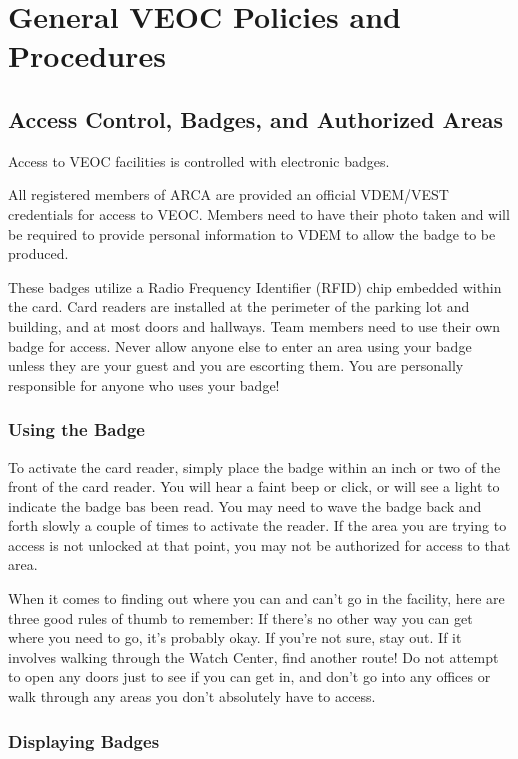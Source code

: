 \documentclass[pdflatex,letterpaper,twoside,12pt]{book}
\begin{document}
\chapter{General VEOC Policies and Procedures}

\section{Access Control, Badges, and Authorized Areas}

Access to VEOC facilities is controlled with electronic badges.

All registered members of ARCA are provided an official VDEM/VEST credentials for access to VEOC.  Members need to have their photo taken and will be required to provide personal information to VDEM to allow the badge to be produced.

These badges utilize a Radio Frequency Identifier (RFID) chip embedded within the card.  Card readers are installed at the perimeter of the parking lot and building, and at most doors and hallways.  Team members need to use their own badge for access.  Never allow anyone else to enter an area using your badge unless they are your guest and you are escorting them.  You are personally responsible for anyone who uses your badge!

\subsection{Using the Badge}

To activate the card reader, simply place the badge within an inch or two of the front of the card reader.  You will hear a faint beep or click, or will see a light to indicate the badge bas been read.  You may need to wave the badge back and forth slowly a couple of times to activate the reader.  If the area you are trying to access is not unlocked at that point, you may not be authorized for access to that area.

When it comes to finding out where you can and can't go in the facility, here are three good rules of thumb to remember:  If there's no other way you can get where you need to go, it's probably okay.  If you're not sure, stay out.  If it involves walking through the Watch Center, find another route!  Do not attempt to open any doors just to see if you can get in, and don't go into any offices or walk through any areas you don't absolutely have to access.

\subsection{Displaying Badges}
\end{document}

